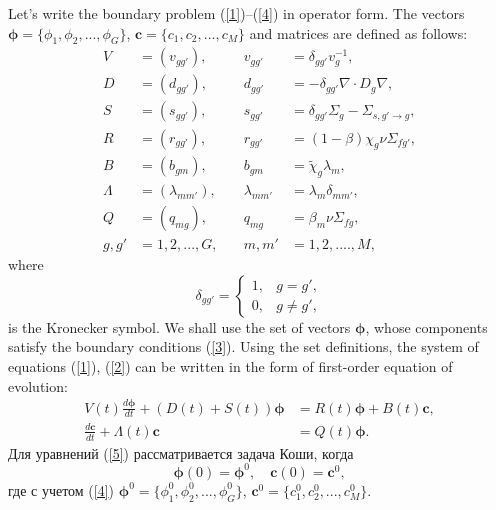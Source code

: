\documentclass[authoryear]{elsarticle}
\begin{document}
Let's write the boundary problem (\ref{1})--(\ref{4}) in operator form. The vectors 
 $\bm \phi = \{\phi_1, \phi_2, ..., \phi_G\}$, $\bm c = \{c_1, c_2, ..., c_M\}$ 
and matrices are defined as follows:
\[
\begin{align}
 V & = (v_{g g'}), &
  \quad v_{g g'} & = \delta_{g g'} v_g^{-1}, \\
 D & = (d_{g g'}), &
 \quad d_{g g'} & = - \delta_{g g'} \nabla \cdot D_g \nabla, \\
 S & = (s_{g g'}), &
 \quad  s_{g g'} & =  \delta_{g g'} \Sigma_g - \Sigma_{s,g'\rightarrow g}, \\
 R & = (r_{g g'}), &
 \quad  r_{g g'} & = (1-\beta)\chi_g \nu \Sigma_{fg'}, \\
 B & = (b_{g m}), &
 \quad b_{g m} & = \widetilde{\chi}_g \lambda_m, \\
 \Lambda & = (\lambda_{m m'}), &
 \quad  \lambda_{m m'} & = \lambda_m \delta_{m m'}, \\
 Q & = (q_{mg}), &
 \quad  q_{mg} & = \beta_m \nu \Sigma_{fg}, \\
 g, g' & = 1,2, ..., G, &
 \quad m, m'  &= 1,2, ....,M,  
\end{align}
\]
where
\[
 \delta_{g g'} = \left \{ 
 \begin{matrix}
 1, & g = g', \\
 0, & g \neq  g',
 \end{matrix}
 \right . 
\] 
is the Kronecker symbol.
We shall use the set of vectors $\bm \phi$, whose components 
satisfy the boundary conditions (\ref{3}). 
Using the set definitions, the system of equations (\ref{1}), (\ref{2})  
can be written in the form of first-order equation of evolution:
\begin{equation}\label{5}
\begin{split}
V(t) \frac{d \bm \phi}{d t} + (D(t)+S(t)) \bm \phi &= R(t) \bm \phi + B(t)\bm c,
\\
\frac{d \bm c}{d t} + \Lambda(t)\bm c &= Q(t) \bm \phi. 
\end{split}
\end{equation}  
Для уравнений (\ref{5})  рассматривается задача Коши, когда
\begin{equation}\label{6}
 \bm \phi(0) = \bm \phi^0,
 \quad   \bm c(0) = \bm c^0,
\end{equation} 
где  с учетом (\ref{4}) $\bm \phi^0 = \{ \phi_1^0,  \phi_2^0, ...,  \phi_G^0 \}$,  $\bm c^0 = \{c_1^0, c_2^0, ..., c_M^0\}$.
\end{document}
